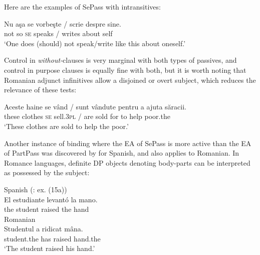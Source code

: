 \documentclass[output=paper]{langsci/langscibook}
\begin{document}
Here are the examples of SePass with intransitives:

\ea%
    \label{ex:giurgea:43}
    \z
\z
 
\ea%
    \label{ex:giurgea:44}
    \gll Nu  aşa  se vorbeşte / scrie   despre sine.\\
         not so   \textsc{se} speaks  / writes about  self\\
    \glt ‘One does (should) not speak\slash write like this about oneself.’
    \z

Control in \textit{without-}clauses is very marginal with both types of passives, and control in purpose clauses is equally fine with both, but it is worth noting that Romanian adjunct infinitives allow a disjoined or overt subject, which reduces the relevance of these tests:

\z


\ea%
    \label{ex:giurgea:46}
    \gll Aceste  haine   se vând     / sunt vândute pentru a ajuta săracii.\\
         these    clothes \textsc{se} sell.\textsc{3pl}  / are sold       for      to help poor.the\\
    \glt ‘These clothes are sold to help the poor.’
    \z

Another instance of binding where the EA of SePass is more active than the EA of PartPass was discovered by \citet{MacDonald2017} for Spanish, and also applies to Romanian. In Romance languages, definite DP objects denoting body-parts can be interpreted as possessed by the subject:

\ea%
    \label{ex:giurgea:47}
    \ea Spanish (\citealt{MacDonald2017}: ex. (15a))\\
    \gll El  estudiante levantó la mano.   \\
         the student     raised   the hand \\
    \ex Romanian\\
    \gll Studentul   a    ridicat mâna.  \\
         student.the has raised hand.the\\
    \glt ‘The student raised his hand.’
    \z
\z    
\end{document}
